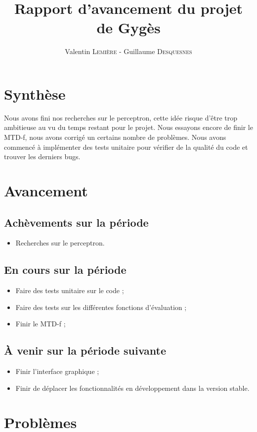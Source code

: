 \documentclass[a4paper]{article}
\title{Rapport d'avancement \no 4 du projet de Gygès}
\author{Valentin \textsc{Lemière} - Guillaume \textsc{Desquesnes}}
\date{}
\begin{document}
\maketitle

\section*{Synthèse}
	Nous avons fini nos recherches sur le perceptron, cette idée risque d'être trop
	ambitieuse au vu du temps restant pour le projet.
	Nous essayons encore de finir le MTD-f, nous avons corrigé un certains nombre de problèmes.
	Nous avons commencé à implémenter des tests unitaire pour vérifier de la qualité
	du code et trouver les derniers bugs.

\section*{Avancement}
	\subsection*{Achèvements sur la période}
		\begin{itemize}
			\item Recherches sur le perceptron.
		\end{itemize}

	\subsection*{En cours sur la période}
		\begin{itemize}
			\item Faire des tests unitaire sur le code ;
			\item Faire des tests sur les différentes fonctions d'évaluation ;
			\item Finir le MTD-f ;
		\end{itemize}

	\subsection*{\`A venir sur la période suivante}
		\begin{itemize}
			\item Finir l'interface graphique ;
			\item Finir de déplacer les fonctionnalités en développement dans la version stable.
		\end{itemize}


\section*{Problèmes}
\end{document}

